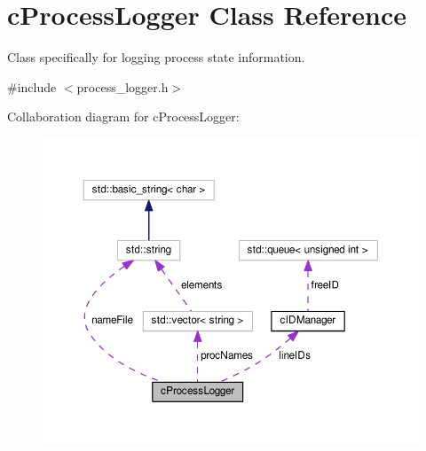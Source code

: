 \hypertarget{classcProcessLogger}{\section{c\-Process\-Logger \-Class \-Reference}
\label{db/d63/classcProcessLogger}
}


\-Class specifically for logging process state information.  




{\ttfamily \#include $<$process\-\_\-logger.\-h$>$}



\-Collaboration diagram for c\-Process\-Logger\-:\nopagebreak
\begin{figure}[H]
\begin{center}
\leavevmode
\includegraphics[width=350pt]{d8/dd6/classcProcessLogger__coll__graph}
\end{center}
\end{figure}
